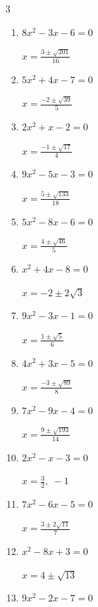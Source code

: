 \begin{multicols}{3}
\begin{enumerate}
        $\displaystyle x=\frac{7\pm \sqrt{33}}{4}$

  \item $8x^{2}-3x-6=0$

        $\displaystyle x=\frac{3\pm \sqrt{201}}{16}$

  \item $5x^{2}+4x-7=0$

        $\displaystyle x=\frac{-2\pm \sqrt{39}}{5}$

\columnbreak %

  \item $2x^{2}+x-2=0$

        $\displaystyle x=\frac{-1\pm \sqrt{17}}{4}$

  \item $9x^{2}-5x-3=0$

        $\displaystyle x=\frac{5\pm \sqrt{133}}{18}$

  \item $5x^{2}-8x-6=0$

        $\displaystyle x=\frac{4\pm \sqrt{46}}{5}$

  \item $x^{2}+4x-8=0$

        $\displaystyle x=-2\pm 2\sqrt{3}$

  \item $9x^{2}-3x-1=0$

        $\displaystyle x=\frac{1\pm \sqrt{5}}{6}$

  \item $4x^{2}+3x-5=0$

        $\displaystyle x=\frac{-3\pm \sqrt{89}}{8}$

  \item $7x^{2}-9x-4=0$

        $\displaystyle x=\frac{9\pm \sqrt{193}}{14}$

\columnbreak %

  \item $2x^{2}-x-3=0$

        $\displaystyle x=\frac{3}{2}, \; -1$

  \item $7x^{2}-6x-5=0$

        $\displaystyle x=\frac{3\pm 2\sqrt{11}}{7}$

  \item $x^{2}-8x+3=0$

        $\displaystyle x=4\pm \sqrt{13}$

  \item $9x^{2}-2x-7=0$


\end{enumerate}
\end{multicols}

